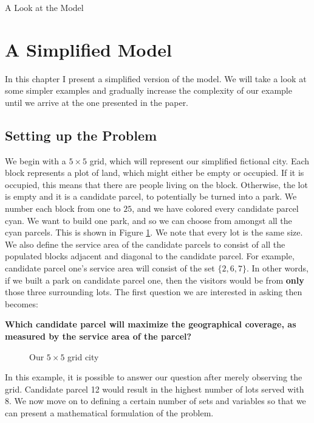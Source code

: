 \documentclass[12pt]{pom_thesis}
\theoremstyle{definition}
\begin{document}
\begin{chapter}{A Look at the Model}
\section{A Simplified Model}
In this chapter I present a simplified version of the model. We will take a look at some simpler examples and gradually increase the complexity of our example until we arrive at the one presented in the paper. 

\subsection{Setting up the Problem}

We begin with a $5\times5$ grid, which will represent our simplified fictional city. Each block represents a plot of land, which might either be empty or occupied. If it is occupied, this means that there are people living on the block. Otherwise, the lot is empty and it is a candidate parcel, to potentially be turned into a park. We number each block from one to $25$, and we have colored every candidate parcel cyan. We want to build one park, and so we can choose from amongst all the cyan parcels. This is shown in Figure \ref{fig:grid1}. We note that every lot is the same size. We also define the service area of the candidate parcels to consist of all the populated blocks adjacent and diagonal to the candidate parcel. For example, candidate parcel one's service area will consist of the set $\{2,6,7\}$. In other words, if we built a park on candidate parcel one, then the visitors would be from \textbf{only} those three surrounding lots. The first question we are interested in asking then becomes: 
\begin{center}
\textbf{Which candidate parcel will maximize the geographical coverage, as measured by the service area of the parcel?}
\end{center}
\begin{figure}
 \centering
 \caption{Our $5\times 5$ grid city}
 \label{fig:grid1}
\end{figure}
In this example, it is possible to answer our question after merely observing the grid. Candidate parcel 12 would result in the highest number of lots served with 8. We now move on to defining a certain number of sets and variables so that we can present a mathematical formulation of the problem. \newline 
	

\end{chapter}
\end{document}
